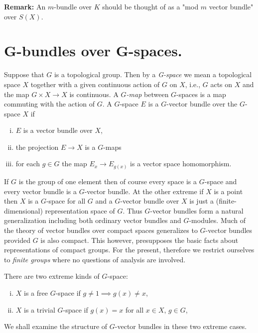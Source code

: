 \textbf{Remark:} An $m$-bundle over $K$ should be thought of as a "mod $m$ vector bundle" over $S(X)$. \newpage 


\section{G-bundles over G-spaces.} Suppose that $G$ is a topological group. Then by a \textit{G-space} we mean a topological space $X$ together with a given continuous action of $G$ on $X$, i.e., $G$ acts on $X$ and the map $G \times X \to X$ is continuous. A \textit{$G$-map} between $G$-spaces is a map commuting with the action of $G$. A $G$-space $E$ is a $G$-vector bundle over the $G$-space $X$ if
\begin{enumerate}[(i)]
    \item $E$ is a vector bundle over $X$,
    \item the projection $E \to X$ is a $G$-maps
    \item for each $g \in G$ the map $E_x \to E_{g(x)}$ is a vector space homomorphism.
\end{enumerate}

If $G$ is the group of one element then of course every space is a $G$-space and every vector bundle is a $G$-vector bundle. At the other extreme if $X$ is a point then $X$ is a $G$-space for all $G$ and a $G$-vector bundle over $X$ is just a (finite-dimensional) representation space of $G$. Thus $G$-vector bundles form a natural generalization including both ordinary vector bundles and $G$-modules. Much of the theory of vector bundles over compact spaces generalizes to $G$-vector bundles provided $G$ is also compact. This however, presupposes the basic facts about representations of compact groups. For the present, therefore we restrict ourselves to \textit{finite groups} where no questions of analysis are involved. \par \hfill

There are two extreme kinds of $G$-space:
\begin{enumerate}[(i)]
    \item $X$ is a free $G$-space if $g \neq 1 \implies g(x) \neq x$,
    \item $X$ is a trivial $G$-space if $g(x) = x$ for all $x \in X$, $g \in G$,
\end{enumerate}

We shall examine the structure of $G$-vector bundles in these two extreme cases. \par 

